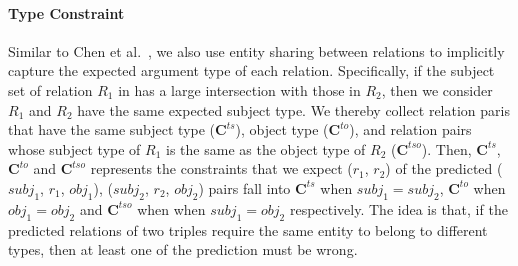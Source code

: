 \paragraph{Type Constraint}
Similar to Chen et al.~, we also use entity sharing between relations to implicitly capture the expected argument type of each relation.
Specifically, if the subject set of relation $R_1$ in \KB has a large intersection with those in $R_2$, then we consider $R_1$ and $R_2$ have the same expected subject type. 
We thereby collect relation paris that have the same subject type ($\textbf{C}^{ts}$), object type ($\textbf{C}^{to}$), and relation pairs whose subject type of $R_1$ is the same as the object type of $R_2$ ($\textbf{C}^{tso}$).
Then, $\textbf{C}^{ts}$, $\textbf{C}^{to}$ and $\textbf{C}^{tso}$ represents the constraints that we expect ($r_1$, $r_2$) of the predicted ($subj_1$, $r_1$, $obj_1$),  ($subj_2$, $r_2$, $obj_2$) pairs fall into $\textbf{C}^{ts}$ when $subj_1=subj_2$, $\textbf{C}^{to}$ when $obj_1=obj_2$ and $\textbf{C}^{tso}$ when when $subj_1=obj_2$ respectively.
The idea is that, if the predicted relations of two triples require the same entity to belong to different types, then at least one of the prediction must be wrong.


